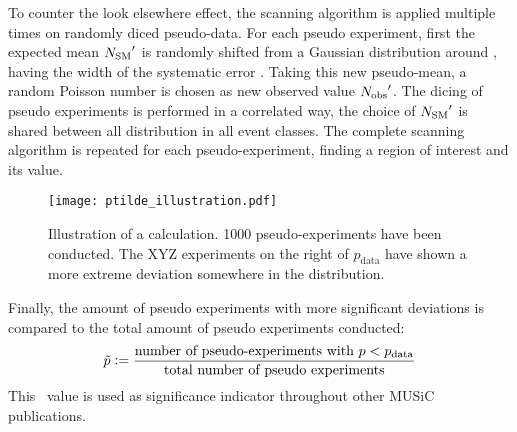 To counter the look elsewhere effect, the scanning algorithm is applied multiple times on randomly diced pseudo-data. For each pseudo experiment, first the expected mean ${N_\mathrm{SM}}'$ is randomly shifted from a Gaussian distribution around \Nmc, having the width of the systematic error \sigmamc. Taking this new pseudo-mean, a random Poisson number is chosen as new observed value ${N_\mathrm{obs}}'$. The dicing of pseudo experiments is performed in a correlated way, the choice of ${N_\mathrm{SM}}'$ is shared between all distribution in all event classes. The complete scanning algorithm is repeated for each pseudo-experiment, finding a region of interest and its \p value.
\begin{figure}[htbp]
	\centering
	\texttt{[image: ptilde\_illustration.pdf]}
	\caption{Illustration of a \ptilde calculation. 1000 pseudo-experiments have been conducted. The XYZ experiments on the right of $p_\mathrm{data}$ have shown a more extreme deviation somewhere in the distribution.}
	\label{fig:ptilde_illustration}
\end{figure}
Finally, the amount of pseudo experiments with more significant deviations is compared to the total amount of pseudo experiments conducted:
\begin{equation}
	\tilde{p} \vcentcolon= \frac{\text{number of pseudo-experiments with } p < p_\mathrm{data}}{\text{total number of pseudo experiments}}
\end{equation}
This \ptilde~value is used as significance indicator throughout other MUSiC publications.




